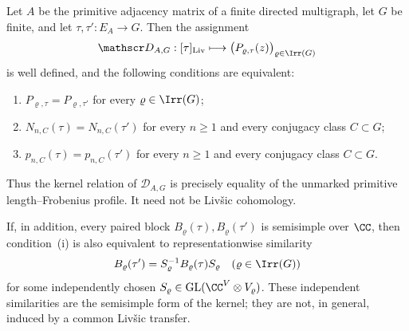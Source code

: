 \begin{theorem}
  \label{thm:inverse-rigidity-main}
  \label{thm:twisted-determinant-kernel}
  Let \(A\) be the primitive adjacency matrix of a finite directed
  multigraph, let \(G\) be finite, and let \(\tau,\tau':E_A\to G\).  Then the
  assignment
  \begin{equation}\label{eq:twisted-determinant-map}
    \mathscr D_{A,G}:[\tau]_{\mathrm{Liv}}
    \longmapsto
    \bigl(P_{\varrho,\tau}(z)\bigr)_{\varrho\in\Irr(G)}
  \end{equation}
  is well defined, and the following conditions are equivalent:
  \begin{enumerate}[label=\textup{(\roman*)},leftmargin=*]
    \item \(P_{\varrho,\tau}=P_{\varrho,\tau'}\) for every
    \(\varrho\in\Irr(G)\);
    \item \(N_{n,C}(\tau)=N_{n,C}(\tau')\) for every \(n\ge1\) and every
    conjugacy class \(C\subset G\);
    \item \(p_{n,C}(\tau)=p_{n,C}(\tau')\) for every \(n\ge1\) and every
    conjugacy class \(C\subset G\).
  \end{enumerate}
  Thus the kernel relation of \(\mathscr D_{A,G}\) is precisely equality of
  the unmarked primitive length--Frobenius profile.  It need not be Liv\v{s}ic
  cohomology.

  If, in addition, every paired block
  \(B_\varrho(\tau),B_\varrho(\tau')\) is semisimple over \(\CC\), then
  condition~\textup{(i)} is also equivalent to representationwise
  similarity
  \begin{equation}\label{eq:representationwise-similarity}
    B_\varrho(\tau')=S_\varrho^{-1}B_\varrho(\tau)S_\varrho
    \quad(\varrho\in\Irr(G))
  \end{equation}
  for some independently chosen \(S_\varrho\in\operatorname{GL}
  (\CC^V\otimes V_\varrho)\).  These independent similarities are the
  semisimple form of the kernel; they are not, in general, induced by a
  common Liv\v{s}ic transfer.
\end{theorem}

